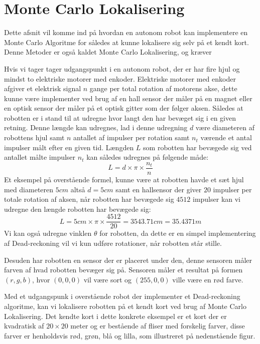 \documentclass[../../SRP.tex]{subfiles}
\begin{document}
\chapter{Monte Carlo Lokalisering}
Dette afsnit vil komme ind på hvordan en autonom robot kan implementere en Monte Carlo Algoritme for således at kunne lokalisere sig selv på et kendt kort. Denne Metoder er også kaldet Monte Carlo Lokalisering, og kræver  

Hvis vi tager tager udgangspunkt i en autonom robot, der er har fire hjul og mindst to elektriske motorer med enkoder. Elektriske motorer med enkoder afgiver et elektrisk signal $n$ gange per total rotation af motorens akse, dette kunne være implementer ved brug af en hall sensor der måler på en magnet eller en optisk sensor der måler på et optisk gitter som der følger aksen. Således at robotten er i stand til at udregne hvor langt den har bevæget sig i en given retning. Denne længde kan udregnes, lad i denne udregning $d$ være diameteren af robottens hjul samt $n$ antallet af impulser per rotation samt $n_t$ værende et antal impulser målt efter en given tid. Længden $L$ som robotten har bevægede sig ved antallet målte impulser $n_t$ kan således udregnes på følgende måde:
\begin{equation}
  L = d \times \pi \times \frac{n_t}{n}
\end{equation}
Et eksempel på overstående formel, kunne være at robotten havde et sæt hjul med diameteren $5cm$ altså $d = 5cm$ samt en hallsensor der giver $20$ impulser per totale rotation af aksen, når robotten har bevægede sig $4512$ impulser kan vi udregne den længde robotten har bevægede sig:
\begin{equation}
  L = 5cm \times \pi \times \frac{4512}{20} = 3543.71cm = 35.4371m
\end{equation}
Vi kan også udregne vinklen $\theta$ for robotten, da dette er en simpel implementering af Dead-reckoning vil vi kun udføre rotationer, når robotten står stille.

Desuden har robotten en sensor der er placeret under den, denne sensoren måler farven af hvad robotten bevæger sig på. Sensoren måler et resultat på formen $(r,g,b)$, hvor $(0,0,0)$ vil være sort og $(255,0,0)$ ville være en rød farve. 

Med et udgangspunk i overstående robot der implementer et Dead-reckoning algoritme, kan vi lokalisere robotten på et kendt kort ved brug af Monte Carlo Lokalisering. Det kendte kort i dette konkrete eksempel er et kort der er kvadratisk af $20 \times 20$ meter og er bestående af fliser med forskelig farver, disse farver er henholdsvis rød, grøn, blå og lilla, som illustreret på nedenstående figur.
\end{document}
